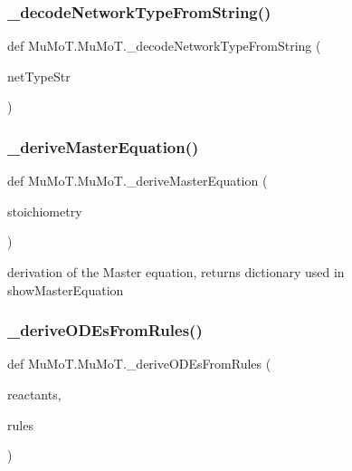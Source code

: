 \subsubsection{\texorpdfstring{\+\_\+decode\+Network\+Type\+From\+String()}{\_decodeNetworkTypeFromString()}}
{\footnotesize\ttfamily def Mu\+Mo\+T.\+Mu\+Mo\+T.\+\_\+decode\+Network\+Type\+From\+String (\begin{DoxyParamCaption}\item[{}]{net\+Type\+Str }\end{DoxyParamCaption})\hspace{0.3cm}{\ttfamily [private]}}

\mbox{\label{namespace_mu_mo_t_1_1_mu_mo_t_a08c33c3f09bc345041d89861f4fb86af}} 
\subsubsection{\texorpdfstring{\+\_\+derive\+Master\+Equation()}{\_deriveMasterEquation()}}
{\footnotesize\ttfamily def Mu\+Mo\+T.\+Mu\+Mo\+T.\+\_\+derive\+Master\+Equation (\begin{DoxyParamCaption}\item[{}]{stoichiometry }\end{DoxyParamCaption})\hspace{0.3cm}{\ttfamily [private]}}



derivation of the Master equation, returns dictionary used in show\+Master\+Equation 

\mbox{\label{namespace_mu_mo_t_1_1_mu_mo_t_a139ce7eb800f1bebc88c8da1bea24d4f}} 
\subsubsection{\texorpdfstring{\+\_\+derive\+O\+D\+Es\+From\+Rules()}{\_deriveODEsFromRules()}}
{\footnotesize\ttfamily def Mu\+Mo\+T.\+Mu\+Mo\+T.\+\_\+derive\+O\+D\+Es\+From\+Rules (\begin{DoxyParamCaption}\item[{}]{reactants,  }\item[{}]{rules }\end{DoxyParamCaption})\hspace{0.3cm}{\ttfamily [private]}}

